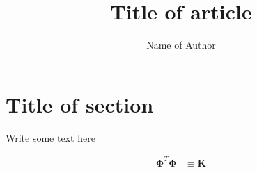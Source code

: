 \documentclass{article}
\title{Title of article}
\author{Name of Author}
\date{}
\begin{document}
\maketitle



\section{Title of section}


Write some text here

\begin{equationbox}
\begin{align}
\boldsymbol{\Phi}^{T}\boldsymbol{\Phi}
&\equiv
\mathbf{K}
\end{align}
\end{equationbox}




%
%
\end{document}
